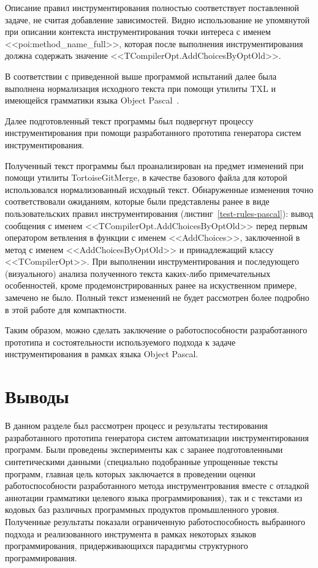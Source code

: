 Описание правил инструментирования полностью соответствует поставленной задаче, не считая добавление зависимостей.
Видно использование не упомянутой при описании контекста инструментирования точки интереса с именем <<poi:method\_name\_full>>, которая после выполнения инструментирования должна содержать значение <<TCompilerOpt.AddChoicesByOptOld>>.

В соответствии с приведенной выше программой испытаний далее была выполнена нормализация исходного текста при помощи утилиты TXL и имеющейся грамматики языка Object Pascal~\cite{txl-resources}.

Далее подготовленный текст программы был подвергнут процессу инструментирования при помощи разработанного прототипа генератора систем инструментирования.

Полученный текст программы был проанализирован на предмет изменений при помощи утилиты TortoiseGitMerge, в качестве базового файла для которой использовался нормализованный исходный текст.
Обнаруженные изменения точно соответствовали ожиданиям, которые были представлены ранее в виде пользовательских правил инструментирования (листинг~\ref{test-rules-pascal}):
вывод сообщения с именем <<TCompilerOpt.AddChoicesByOptOld>> перед первым оператором ветвления в функции с именем <<AddChoices>>, заключенной в метод с именем <<AddChoicesByOptOld>> и принадлежащий классу <<TCompilerOpt>>.
При выполнении инструментирования и последующего (визуального) анализа полученного текста каких-либо примечательных особенностей, кроме продемонстрированных ранее на искуственном примере, замечено не было.
Полный текст изменений не будет рассмотрен более подробно в этой работе для компактности.

Таким образом, можно сделать заключение о работоспособности разработанного прототипа и состоятельности используемого подхода к задаче инструментирования в рамках языка Object Pascal.

\section{Выводы}

В данном разделе был рассмотрен процесс и результаты тестирования разработанного прототипа генератора систем автоматизации инструментирования программ.
Были проведены эксперименты как с заранее подготовленными синтетическими данными (специально подобранные упрощенные тексты программ, главная цель которых заключается в проведении оценки работоспособности разработанного метода инструментрования вместе с отладкой аннотации грамматики целевого языка программирования), так и с текстами из кодовых баз различных программных продуктов промышленного уровня.
Полученные результаты показали ограниченную работоспособность выбранного подхода и реализованного инструмента в рамках некоторых языков программирования, придерживающихся парадигмы структурного программирования.

